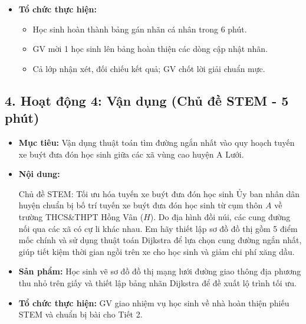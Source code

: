 \documentclass[12pt, a4paper]{article}
\begin{document}
\begin{itemize}[leftmargin=1.2cm]
    \begin{itemize}[leftmargin=0.6cm]
        \item Độ trễ nhỏ nhất từ máy chủ $S$ đến máy chủ $T$ là $d(T) = 13\text{ ms}$.
        \item Truy vết: $T \leftarrow D \leftarrow A \leftarrow S$.
        \item Lộ trình truyền tối ưu: $S \to A \to D \to T$ với tổng độ trễ là: $7 + 4 + 2 = 13\text{ ms}$.
    \end{itemize}

    \item[d)] \textbf{Tổ chức thực hiện:}
    \begin{itemize}[leftmargin=0.6cm]
        \item Học sinh hoàn thành bảng gán nhãn cá nhân trong 6 phút.
        \item GV mời 1 học sinh lên bảng hoàn thiện các dòng cập nhật nhãn.
        \item Cả lớp nhận xét, đối chiếu kết quả; GV chốt lời giải chuẩn mực.
    \end{itemize}
\end{itemize}

\subsection*{4. Hoạt động 4: Vận dụng (Chủ đề STEM - 5 phút)}

\begin{itemize}[leftmargin=1.2cm]
    \item[a)] \textbf{Mục tiêu:} Vận dụng thuật toán tìm đường ngắn nhất vào quy hoạch tuyến xe buýt đưa đón học sinh giữa các xã vùng cao huyện A Lưới.
    \item[b)] \textbf{Nội dung:}
    \begin{stembox}{Chủ đề STEM: Tối ưu hóa tuyến xe buýt đưa đón học sinh}
        Ủy ban nhân dân huyện chuẩn bị bố trí tuyến xe buýt đưa đón học sinh từ cụm thôn $A$ về trường THCS\&THPT Hồng Vân ($H$). Do địa hình đồi núi, các cung đường nối qua các xã có cự li khác nhau. Em hãy thiết lập sơ đồ đồ thị gồm 5 điểm mốc chính và sử dụng thuật toán Dijkstra để lựa chọn cung đường ngắn nhất, giúp tiết kiệm thời gian ngồi trên xe cho học sinh và giảm chi phí xăng dầu.
    \end{stembox}
    \item[c)] \textbf{Sản phẩm:} Học sinh vẽ sơ đồ đồ thị mạng lưới đường giao thông địa phương thu nhỏ trên giấy và thiết lập bảng nhãn Dijkstra để đề xuất lộ trình tối ưu.
    \item[d)] \textbf{Tổ chức thực hiện:} GV giao nhiệm vụ học sinh về nhà hoàn thiện phiếu STEM và chuẩn bị bài cho Tiết 2.
\end{itemize}
\end{document}
